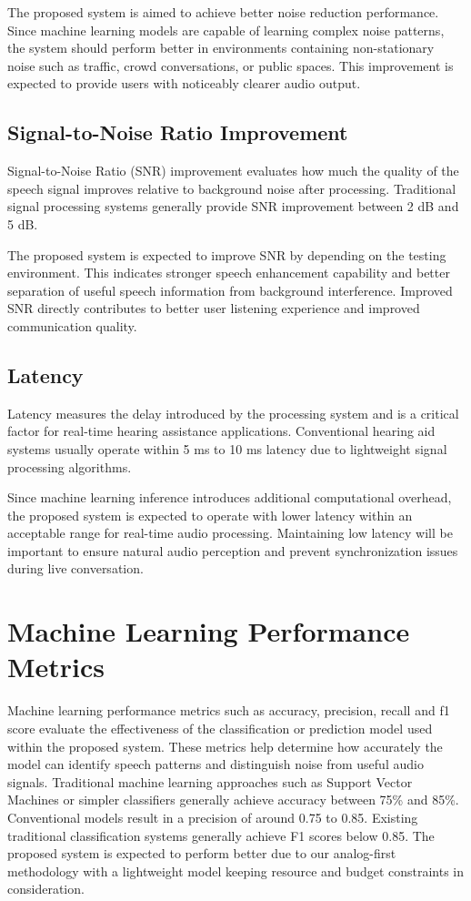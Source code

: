 The proposed system is aimed to achieve better noise reduction performance. Since machine learning models are capable of learning complex noise patterns, the system should perform better in environments containing non-stationary noise such as traffic, crowd conversations, or public spaces. This improvement is expected to provide users with noticeably clearer audio output.

\subsection{Signal-to-Noise Ratio Improvement}
Signal-to-Noise Ratio (SNR) improvement evaluates how much the quality of the speech signal improves relative to background noise after processing. Traditional signal processing systems generally provide SNR improvement between 2 dB and 5 dB.

The proposed system is expected to improve SNR by depending on the testing environment. This indicates stronger speech enhancement capability and better separation of useful speech information from background interference. Improved SNR directly contributes to better user listening experience and improved communication quality.

\subsection{Latency}
Latency measures the delay introduced by the processing system and is a critical factor for real-time hearing assistance applications. Conventional hearing aid systems usually operate within 5 ms to 10 ms latency due to lightweight signal processing algorithms.

Since machine learning inference introduces additional computational overhead, the proposed system is expected to operate with lower latency within an acceptable range for real-time audio processing. Maintaining low latency will be important to ensure natural audio perception and prevent synchronization issues during live conversation.

\section{Machine Learning Performance Metrics}
Machine learning performance metrics such as accuracy, precision, recall and f1 score evaluate the effectiveness of the classification or prediction model used within the proposed system. These metrics help determine how accurately the model can identify speech patterns and distinguish noise from useful audio signals. Traditional machine learning approaches such as Support Vector Machines or simpler classifiers generally achieve accuracy between 75\% and 85\%. Conventional models result in a precision of around 0.75 to 0.85. Existing traditional classification systems generally achieve F1 scores below 0.85. The proposed system is expected to perform better due to our analog-first methodology with a lightweight model keeping resource and budget constraints in consideration.


